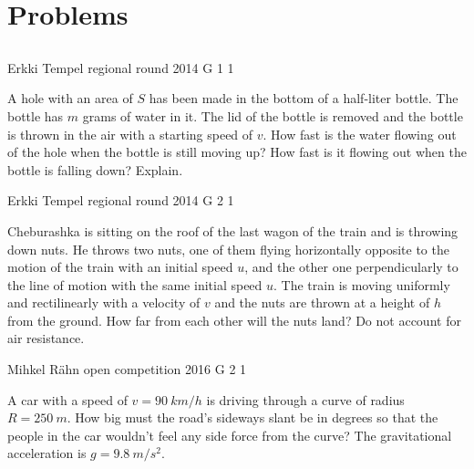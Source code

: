 \documentclass[11pt]{article}
\begin{document}
        \section{Problems}
        \ToggleEngStatement
        \subsection{\protect{}}

\graphicspath{{../problems/}}

{Erkki Tempel} %
{regional round} %
{2014} %
{G 1} %
{1} %
{

\ifEngStatement
A hole with an area of $S$ has been made in the bottom of a half-liter bottle. The bottle has $m$ grams of water in it. The lid of the bottle is removed and the bottle is thrown in the air with a starting speed of $v$. How fast is the water flowing out of the hole when the bottle is still moving up? How fast is it flowing out when the bottle is falling down? Explain.
\fi
}

{Erkki Tempel} %
{regional round} %
{2014} %
{G 2} %
{1} %
{

\ifEngStatement
Cheburashka is sitting on the roof of the last wagon of the train and is throwing down nuts. He throws two nuts, one of them flying horizontally opposite to the motion of the train with an initial speed $u$, and the other one perpendicularly to the line of motion with the same initial speed $u$. The train is moving uniformly and rectilinearly with a velocity of $v$ and the nuts are thrown at a height of $h$ from the ground. How far from each other will the nuts land? Do not account for air resistance.
\fi
}

{Mihkel Rähn} %
{open competition} %
{2016} %
{G 2} %
{1} %
{

\ifEngStatement
A car with a speed of $v=\SI{90}{km/h}$ is driving through a curve of radius $R=\SI{250}{m}$. How big must the road’s sideways slant be in degrees so that the people in the car wouldn’t feel any side force from the curve? The gravitational acceleration is $g=\SI{9.8}{m/s^{2}}$.
\fi
}
\end{document}
